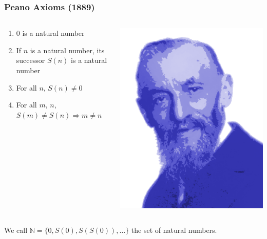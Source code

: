 \documentclass{beamer}
\def\N{\mathbb{N}}
\begin{document}
\begin{frame}
    \frametitle{Peano Axioms (1889)}
    \begin{columns}
        \begin{column}{.75\textwidth}
            \begin{enumerate}
                \item 0 is a natural number
                \item If $n$ is a natural number, its successor $S(n)$ is a natural number
                \item For all $n$, $S(n) \neq 0$
                \item For all $m$, $n$, $S(m) \neq S(n) \Rightarrow m \neq n$
            \end{enumerate}
        \end{column}
        \begin{column}{.25\textwidth}
            \includegraphics[height=.25\textheight]{images/Giuseppe_Peano.png}
            \vfill
        \end{column}
    \end{columns}
    \vspace{2.5em}
    We call $\N = \{ 0, S(0), S(S(0)), \dots \}$ the set of natural numbers.
\end{frame}
\end{document}
